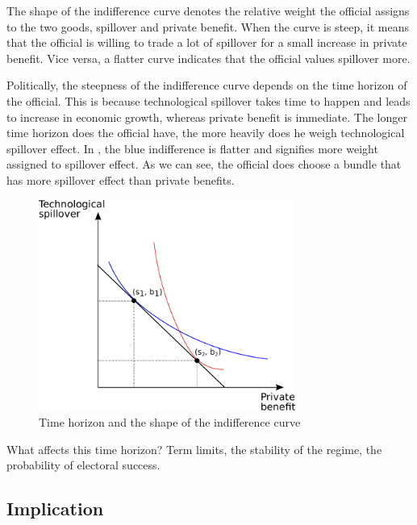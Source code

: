 The shape of the indifference curve denotes the relative weight the official assigns to the two goods, spillover and private benefit. When the curve is steep, it means that the official is willing to trade a lot of spillover for a small increase in private benefit. Vice versa, a flatter curve indicates that the official values spillover more.

Politically, the steepness of the indifference curve depends on the time horizon of the official. This is because technological spillover takes time to happen and leads to increase in economic growth, whereas private benefit is immediate. The longer time horizon does the official have, the more heavily does he weigh technological spillover effect. In , the blue indifference is flatter and signifies more weight assigned to spillover effect. As we can see, the official does choose a bundle that has more spillover effect than private benefits.

\begin{figure}[!ht]
	\centering
    \includegraphics[width=0.75\textwidth, height=0.75\textheight,keepaspectratio]{../figure/indifference_curve}
    \caption{Time horizon and the shape of the indifference curve}
    \label{fig:indifference_curve}
\end{figure}

What affects this time horizon? Term limits, the stability of the regime, the probability of electoral success.

\subsection{Implication}